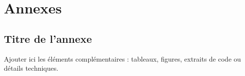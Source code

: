 \chapter*{Annexes}
\appendix

\renewcommand{\thesection}{\Alph{section}.}
\section{Titre de l'annexe}
Ajouter ici les éléments complémentaires : tableaux, figures, extraits de code ou détails techniques.
